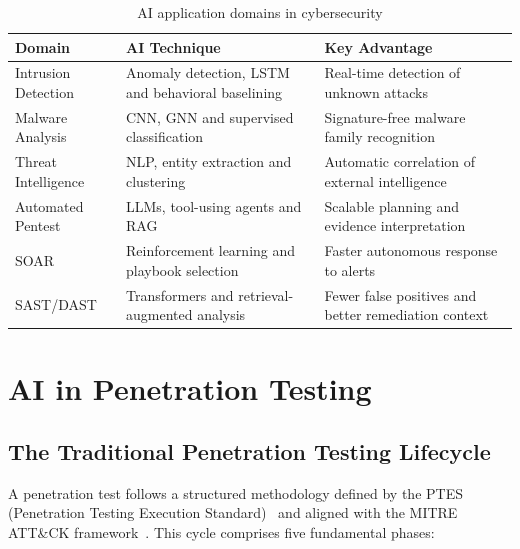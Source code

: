 \documentclass[12pt,a4paper]{report}
\begin{document}
\begin{table}[H]
    \centering
    \renewcommand{\arraystretch}{1.35}
    \begin{tabular}{|p{}|p{}|p{}|}
        \hline
        \textbf{Domain} & \textbf{AI Technique} & \textbf{Key Advantage} \\
        \hline
        Intrusion Detection & Anomaly detection, LSTM and behavioral baselining & Real-time detection of unknown attacks \\
        \hline
        Malware Analysis & CNN, GNN and supervised classification & Signature-free malware family recognition \\
        \hline
        Threat Intelligence & NLP, entity extraction and clustering & Automatic correlation of external intelligence \\
        \hline
        Automated Pentest & LLMs, tool-using agents and RAG & Scalable planning and evidence interpretation \\
        \hline
        SOAR & Reinforcement learning and playbook selection & Faster autonomous response to alerts \\
        \hline
        SAST/DAST & Transformers and retrieval-augmented analysis & Fewer false positives and better remediation context \\
        \hline
    \end{tabular}
    \caption{AI application domains in cybersecurity}
    \label{tab:ai_domains}
\end{table}

\section{AI in Penetration Testing}

\subsection{The Traditional Penetration Testing Lifecycle}

A penetration test follows a structured methodology defined by the PTES
(Penetration Testing Execution Standard)~\cite{ptes} and aligned with the MITRE ATT\&CK framework~\cite{mitreattack}. This cycle comprises five fundamental phases:
\end{document}
